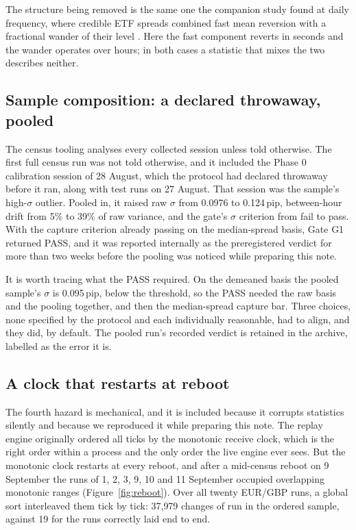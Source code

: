 \documentclass[11pt]{article}
\begin{document}
The structure being removed is the same one the companion study found
at daily frequency, where credible ETF spreads combined fast mean
reversion with a fractional wander of their level \cite{ross2026}. Here
the fast component reverts in seconds and the wander operates over
hours; in both cases a statistic that mixes the two describes neither.

\subsection{Sample composition: a declared throwaway, pooled}
\label{sec:pooling}

The census tooling analyses every collected session unless told
otherwise. The first full census run was not told otherwise, and it
included the Phase 0 calibration session of 28 August, which the
protocol had declared throwaway before it ran, along with test runs on
27 August. That session was the sample's high-$\sigma$
outlier. Pooled in, it raised raw $\sigma$ from 0.0976 to 0.124\,pip,
between-hour drift from 5\% to 39\% of raw variance, and the gate's
$\sigma$ criterion from fail to pass. With the capture criterion
already passing on the median-spread basis, Gate G1 returned PASS, and
it was reported internally as the preregistered verdict for more than
two weeks before the pooling was noticed while preparing this note.

It is worth tracing what the PASS required. On the demeaned basis the
pooled sample's $\sigma$ is 0.095\,pip, below the threshold, so the
PASS needed the raw basis and the pooling together, and then the
median-spread capture bar. Three choices, none specified by the
protocol and each individually reasonable, had to align, and they did,
by default. The pooled run's recorded verdict is retained in the
archive, labelled as the error it is.

\subsection{A clock that restarts at reboot}\label{sec:reboot}

The fourth hazard is mechanical, and it is included because it
corrupts statistics silently and because we reproduced it while
preparing this note. The replay engine originally ordered all ticks by
the monotonic receive clock, which is the right order within a process
and the only order the live engine ever sees. But the monotonic clock
restarts at every reboot, and after a mid-census reboot on 9 September
the runs of 1, 2, 3, 9, 10 and 11 September occupied overlapping
monotonic ranges (Figure~\ref{fig:reboot}). Over all twenty EUR/GBP
runs, a global sort interleaved them tick by tick: 37{,}979 changes of
run in the ordered sample, against 19 for the runs correctly laid end
to end.
\end{document}
